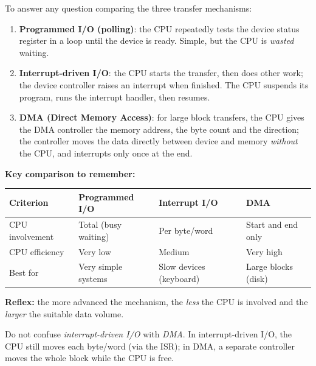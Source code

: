 \documentclass[11pt]{article}
\newcommand{\cle}[1]{{\popxbold\color{popdark}#1}}
\begin{document}
\begin{methode}
To answer any question comparing the three transfer mechanisms:
\begin{enumerate}
\item \textbf{Programmed I/O (polling)}: the CPU repeatedly tests the device status register in a loop until the device is ready. Simple, but the CPU is \emph{wasted} waiting.
\item \textbf{Interrupt-driven I/O}: the CPU starts the transfer, then does other work; the device controller raises an \cle{interrupt} when finished. The CPU suspends its program, runs the \cle{interrupt handler}, then resumes.
\item \textbf{DMA (Direct Memory Access)}: for large block transfers, the CPU gives the \cle{DMA controller} the memory address, the byte count and the direction; the controller moves the data directly between device and memory \emph{without} the CPU, and interrupts only once at the end.
\end{enumerate}
\textbf{Key comparison to remember:}
\begin{center}
\begin{tabularx}{\linewidth}{|l|X|X|X|}
\hline
\rowcolor{popblueL} \textbf{Criterion} & \textbf{Programmed I/O} & \textbf{Interrupt I/O} & \textbf{DMA} \\
\hline
CPU involvement & Total (busy waiting) & Per byte/word & Start and end only \\
\hline
CPU efficiency & Very low & Medium & Very high \\
\hline
Best for & Very simple systems & Slow devices (keyboard) & Large blocks (disk) \\
\hline
\end{tabularx}
\end{center}
\textbf{Reflex:} the more advanced the mechanism, the \emph{less} the CPU is involved and the \emph{larger} the suitable data volume.
\end{methode}

\begin{attention}
Do not confuse \emph{interrupt-driven I/O} with \emph{DMA}. In interrupt-driven I/O, the CPU still moves each byte/word (via the ISR); in DMA, a separate controller moves the whole block while the CPU is free.
\end{attention}
\end{document}

